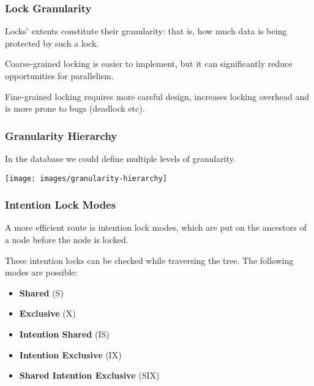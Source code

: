 \begin{frame}
\frametitle{Lock Granularity}

Locks' extents constitute their \alert{granularity}: that is, how much data is being protected by such a lock.

\alert{Coarse-grained} locking is easier to implement, but it can significantly reduce opportunities for parallelism. 

\alert{Fine-grained locking} requires more careful design, increases locking overhead and is more prone to bugs (deadlock etc).

 
\end{frame}

\begin{frame}
\frametitle{Granularity Hierarchy}
In the database we could define multiple levels of granularity. 

\begin{center}
\texttt{[image: images/granularity-hierarchy]}
\end{center}


\end{frame}

\begin{frame}
\frametitle{Intention Lock Modes}

A more efficient route is \alert{intention lock modes}, which are put on the ancestors of a node before the node is locked.

These intention locks can be checked while traversing the tree. The following modes are possible:

\begin{itemize}
	\item \textbf{Shared} (S)
	\item \textbf{Exclusive} (X) 
	\item \textbf{Intention Shared} (IS) 
	\item \textbf{Intention Exclusive} (IX) 
	\item \textbf{Shared Intention Exclusive} (SIX)
\end{itemize} 


\end{frame}

